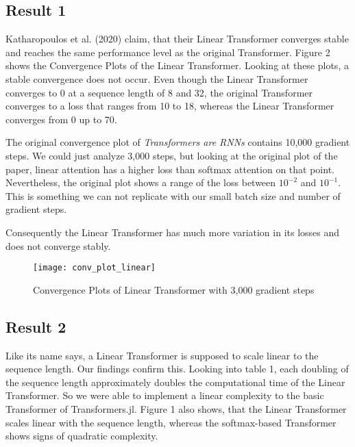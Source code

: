 \documentclass[DIV=13,fontsize=11pt]{scrartcl}
\begin{document}


\subsection{Result 1}
Katharopoulos et al. (2020) claim, that their Linear Transformer converges stable and reaches the same performance level as the original Transformer.  Figure 2 shows the Convergence Plots of the Linear Transformer. Looking at these plots, a stable convergence does not occur.  Even though the Linear Transformer converges to 0 at a sequence length of 8 and 32, the original Transformer converges to a loss that ranges from 10 to 18, whereas the Linear Transformer converges from 0 up to 70.  

The original convergence plot of  \textit{Transformers are RNNs} contains 10,000 gradient steps. We could just analyze 3,000 steps, but looking at the original plot of the paper, linear attention has a higher loss than softmax attention on that point. Nevertheless, the original plot shows a range of the loss between \(10^{-2}\) and  \(10^{-1}\).  This is something we can not replicate with our small  batch size and number of gradient steps.

Consequently the Linear Transformer has much more variation in its losses and does not converge stably. 

\begin{figure}[h]
    \centering
    \texttt{[image: conv\_plot\_linear]}
    \caption{Convergence Plots of Linear Transformer with 3,000 gradient steps}
    \label{fig:mesh1}
\end{figure}

\subsection{Result 2}
Like its name says, a Linear Transformer is supposed to scale linear to the sequence length. Our findings confirm this. Looking into table 1, each doubling of the sequence length approximately
doubles the computational time of the Linear Transformer. So we were able to implement a linear complexity to the basic Transformer of Transformers.jl. 
Figure 1 also shows, that the Linear Transformer scales linear with the sequence length, whereas the softmax-based Transformer shows signs of quadratic complexity.
\end{document}
